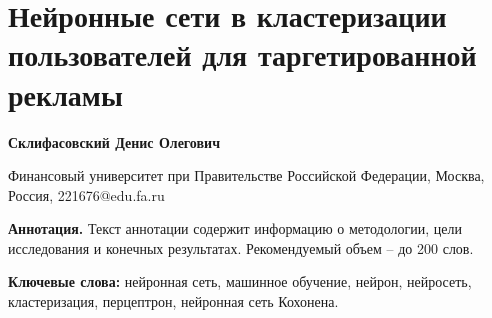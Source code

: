 \section*{Нейронные сети в кластеризации пользователей для таргетированной рекламы}

\noindent\textbf{Склифасовский Денис Олегович}

\noindent Финансовый университет при Правительстве Российской Федерации, Москва, Россия, 221676@edu.fa.ru

\textbf{Аннотация.} Текст аннотации содержит информацию о методологии, цели исследования и конечных результатах. Рекомендуемый объем – до 200 слов.

\textbf{Ключевые слова:} нейронная сеть, машинное обучение, нейрон, нейросеть, кластеризация, перцептрон, нейронная сеть Кохонена.

\pagebreak